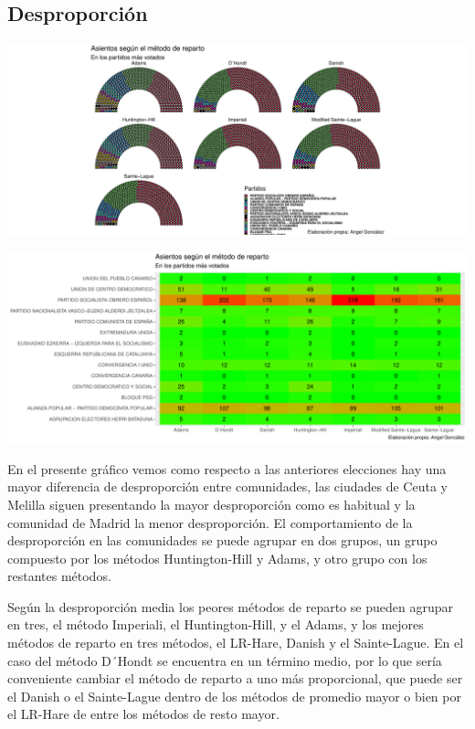 \documentclass[12pt,a4paper,]{book}
\numberwithin{dummy}{section}
\theoremstyle{ocrenumbox}
\theoremstyle{blacknumex}
\theoremstyle{blacknumbox}
\theoremstyle{ocrenum}
\theoremstyle{ocrenum}
\begin{document}
\hypertarget{desproporciuxf3n-1}{%
\subsection{Desproporción}\label{desproporciuxf3n-1}}

\begin{center}\includegraphics[width=1\linewidth]{figurasR/unnamed-chunk-80-1} \end{center}

\begin{center}\includegraphics[width=1\linewidth]{figurasR/unnamed-chunk-80-2} \end{center}

En el presente gráfico vemos como respecto a las anteriores elecciones
hay una mayor diferencia de desproporción entre comunidades, las
ciudades de Ceuta y Melilla siguen presentando la mayor desproporción
como es habitual y la comunidad de Madrid la menor desproporción. El
comportamiento de la desproporción en las comunidades se puede agrupar
en dos grupos, un grupo compuesto por los métodos Huntington-Hill y
Adams, y otro grupo con los restantes métodos.

Según la desproporción media los peores métodos de reparto se pueden
agrupar en tres, el método Imperiali, el Huntington-Hill, y el Adams, y
los mejores métodos de reparto en tres métodos, el LR-Hare, Danish y el
Sainte-Lague. En el caso del método D´Hondt se encuentra en un término
medio, por lo que sería conveniente cambiar el método de reparto a uno
más proporcional, que puede ser el Danish o el Sainte-Lague dentro de
los métodos de promedio mayor o bien por el LR-Hare de entre los métodos
de resto mayor.
\end{document}
